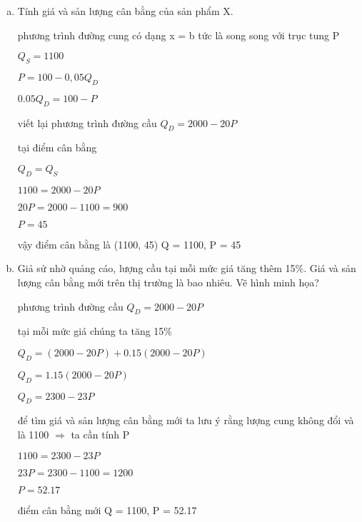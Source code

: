 \documentclass{report}
\begin{document}
\begin{enumerate}[a.]
    \item Tính giá và sản lượng cân bằng của sản phẩm X.
    
    phương trình đường cung có dạng
    x = b tức là song song với trục tung P

    $Q_S = 1100$

    $P = 100 - 0,05Q_D$

    $0.05Q_D = 100 - P$

    viết lại phương trình đường cầu
    $Q_D = 2000 - 20P$

    tại điểm cân bằng 

    $Q_D = Q_S$

    $1100 = 2000 - 20P$

    $20P = 2000 - 1100 = 900$

    $P = 45$

    vậy điểm cân bằng là 
    (1100, 45)
    Q = 1100, P = 45

    

    \item  Giả sử nhờ quảng cáo, lượng cầu tại mỗi mức giá tăng thêm 15\%. Giá và sản lượng 
    cân bằng mới trên thị trường là bao nhiêu. Vẽ hình minh họa?

    phương trình đường cầu
    $Q_D = 2000 - 20P$

    tại mỗi mức giá chúng ta tăng 15\%

    $Q_D = (2000 - 20P) + 0.15( 2000 - 20P)$

    $Q_D = 1.15(2000 - 20P)$

    $Q_D = 2300 - 23P$

    để tìm giá và sản lượng cân bằng mới 
    ta lưu ý rằng lượng cung không đổi và là 1100
    $\Rightarrow$ ta cần tính P

    $1100 = 2300 - 23P$

    $23P = 2300 - 1100 = 1200$

    $P = 52.17$

    điểm cân bằng mới 
    Q = 1100, P = 52.17


\end{enumerate}
\end{document}
